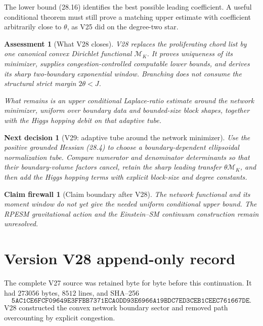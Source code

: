 \documentclass[11pt]{article}
\newtheorem{firewall}[theorem]{Claim firewall}
\newtheorem{decision}[theorem]{Next decision}
\newtheorem{assessment}[theorem]{Assessment}
\theoremstyle{remark}
\begin{document}
The lower bound (28.16) identifies the best possible leading
coefficient.  A useful conditional theorem must still prove a matching
upper estimate with coefficient arbitrarily close to \(\theta\), as V25
did on the degree-two star.

\begin{assessment}[What V28 closes]
\label{ass:v17v28-status}
V28 replaces the proliferating chord list by one canonical convex
Dirichlet functional \(\mathcal M_K\).  It proves uniqueness of its
minimizer, supplies congestion-controlled computable lower bounds, and
derives its sharp two-boundary exponential window.  Branching does not
consume the structural strict margin \(2\theta<J\).

What remains is an upper conditional Laplace-ratio estimate around the
network minimizer, uniform over boundary data and bounded-size block
shapes, together with the Higgs hopping debit on that adaptive tube.
\end{assessment}

\begin{decision}[V29: adaptive tube around the network minimizer]
\label{dec:v17v28-next}
Use the positive grounded Hessian (28.4) to choose a boundary-dependent
ellipsoidal normalization tube.  Compare numerator and denominator
determinants so that their boundary-volume factors cancel, retain the
sharp leading transfer \(\theta\mathcal M_K\), and then add the Higgs
hopping terms with explicit block-size and degree constants.
\end{decision}

\begin{firewall}[Claim boundary after V28]
\label{fire:v17v28}
The network functional and its moment window do not yet give the needed
uniform conditional upper bound.  The RPESM gravitational action and
the Einstein--SM continuum construction remain unresolved.
\end{firewall}

\section*{Version V28 append-only record}
The complete V27 source was retained byte for byte before this
continuation.  It had \(273056\) bytes, \(8512\) lines, and SHA--256
\[
 \texttt{5AC1CE6FCF09649E3FFBB7371ECA0DD93E6966A19BDC7ED3CEB1CEEC761667DE}.
\]
V28 constructed the convex network boundary sector and removed path
overcounting by explicit congestion.
\end{document}
